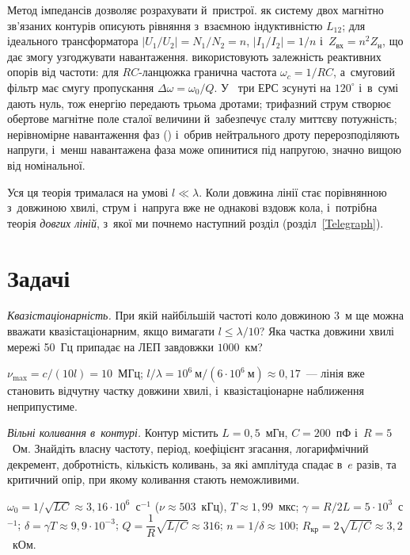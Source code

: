 Метод імпедансів дозволяє розрахувати й~пристрої.  як систему двох магнітно зв'язаних контурів описують рівняння з~взаємною індуктивністю $L_{12}$; для ідеального трансформатора $|U_1/U_2| = N_1/N_2 = n$, $|I_1/I_2| = 1/n$ і~$Z_\text{вх} = n^2Z_\text{н}$, що дає змогу узгоджувати навантаження.  використовують залежність реактивних опорів від частоти: для $RC$-ланцюжка гранична частота $\omega_c = 1/RC$, а~смуговий фільтр має смугу пропускання $\Delta\omega = \omega_0/Q$. У~ три ЕРС зсунуті на $120^\circ$ і~в~сумі дають нуль, тож енергію передають трьома дротами; трифазний струм створює обертове магнітне поле сталої величини й~забезпечує сталу миттєву потужність; нерівномірне навантаження фаз () і~обрив нейтрального дроту перерозподіляють напруги, і~менш навантажена фаза може опинитися під напругою, значно вищою від номінальної.

Уся ця теорія трималася на умові $l \ll \lambda$. Коли довжина лінії стає порівнянною з~довжиною хвилі, струм і~напруга вже не однакові вздовж кола, і~потрібна теорія \emph{довгих ліній}, з~якої ми почнемо наступний розділ (розділ~\ref{Telegraph}).


\section*{Задачі}


\begin{problem}\label{prb:QuasiStationarity}
	\emph{Квазістаціонарність.} При якій найбільшій частоті коло довжиною $3$~м ще можна вважати квазістаціонарним, якщо вимагати $l\leqslant\lambda/10$? Яка частка довжини хвилі мережі 50~Гц припадає на ЛЕП завдовжки $1000$~км?
	\begin{solution}
		$\nu_{\max}=c/(10l)=10$~МГц; $l/\lambda=10^{6}\ \text{м}/(6\cdot10^{6}\ \text{м})\approx0{,}17$~--- лінія вже становить відчутну частку довжини хвилі, і~квазістаціонарне наближення неприпустиме.
	\end{solution}
\end{problem}

\begin{problem}\label{prb:FreeOscillationsNumbers}
	\emph{Вільні коливання в~контурі.} Контур містить $L=0{,}5$~мГн, $C=200$~пФ і~$R=5$~Ом. Знайдіть власну частоту, період, коефіцієнт згасання, логарифмічний декремент, добротність, кількість коливань, за які амплітуда спадає в~$e$ разів, та критичний опір, при якому коливання стають неможливими.
	\begin{solution}
		$\omega_0=1/\sqrt{LC}\approx3{,}16\cdot10^{6}$~с$^{-1}$ ($\nu\approx503$~кГц), $T\approx1{,}99$~мкс; $\gamma=R/2L=5\cdot10^{3}$~с$^{-1}$; $\delta=\gamma T\approx9{,}9\cdot10^{-3}$; $Q=\dfrac{1}{R}\sqrt{L/C}\approx316$; $n=1/\delta\approx100$; $R_\text{кр}=2\sqrt{L/C}\approx3{,}2$~кОм.
	\end{solution}
\end{problem}


